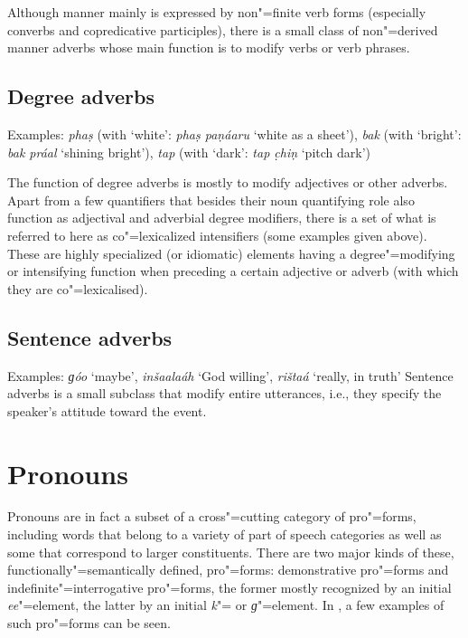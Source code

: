 Although manner mainly is expressed by non"=finite verb forms (especially converbs and copredicative participles), there is a small class of non"=derived manner adverbs whose main function is to modify verbs or verb phrases.


\subsection{Degree adverbs}
\label{subsec:3b-5-4}
Examples: \textit{phaṣ} (with `white': \textit{phaṣ paṇáaru} `white as a sheet'), \textit{bak} (with `bright': \textit{bak práal} `shining bright'), \textit{tap} (with `dark': \textit{tap c̣hiṇ} `pitch dark')


The function of degree adverbs is mostly to modify adjectives or other adverbs. Apart from a few quantifiers that besides their noun quantifying role also function as adjectival and adverbial degree modifiers, there is a set of what is referred to here as co"=lexicalized intensifiers (some examples given above). These are highly specialized (or idiomatic) elements having a degree"=modifying or intensifying function when preceding a certain adjective or adverb (with which they are co"=lexicalised). 


\subsection{Sentence adverbs}
\label{subsec:3b-5-5}
Examples: \textit{ɡóo} `maybe', \textit{inšaalaáh} `God willing', \textit{rištaá} `really, in truth'
Sentence adverbs is a small subclass that modify entire utterances, i.e., they specify the speaker’s attitude toward the event.


\section{Pronouns}
\label{sec:3b-6}
Pronouns are in fact a subset of a cross"=cutting category of pro"=forms, including words that belong to a variety of part of speech categories as well as some that correspond to larger constituents. There are two major kinds of these, functionally"=semantically defined, pro"=forms: demonstrative pro"=forms and indefinite"=interrogative pro"=forms, the former mostly recognized by an initial \textit{ee}"=element, the latter by an initial \textit{k}"= or \textit{ɡ}"=element. In , a few examples of such pro"=forms can be seen.


